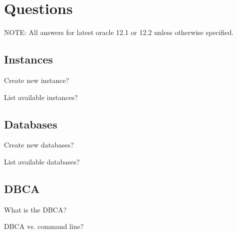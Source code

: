 
\newpage
\section{Questions}

NOTE: All answers for latest oracle 12.1 or 12.2 unless
otherwise specified.

\subsection{Instances}
\begin{itemize*}
     \item{} Create new instance?
     \item{} List available instances?
\end{itemize*}

\subsection{Databases}
\begin{itemize*}
     \item{} Create new databases?
     \item{} List available databases?
\end{itemize*}

\subsection{DBCA}
\begin{itemize*}
     \item{} What is the DBCA?
     \item{} DBCA vs. command line?
\end{itemize*}


